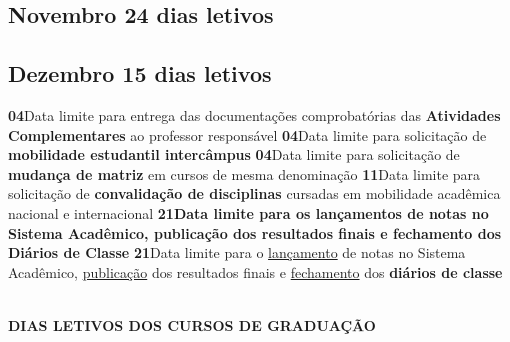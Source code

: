\documentclass[thesis]{hmcposter}
\begin{document}
\begin{poster}
\subsection{Novembro \hfill 24 dias letivos}\subsection{Dezembro \hfill 15 dias letivos}\textbf{04}\qquad Data limite para entrega das documentações comprobatórias das \textbf{Atividades Complementares} ao professor responsável \newline \null\textbf{04}\qquad Data limite para solicitação de \textbf{mobilidade estudantil intercâmpus} \newline \null\textbf{04}\qquad Data limite para solicitação de \textbf{mudança de matriz} em cursos de mesma denominação \newline \null\textbf{11}\qquad Data limite para solicitação de \textbf{convalidação de disciplinas} cursadas em mobilidade acadêmica nacional e internacional \newline \null\textbf{21}\qquad \textbf{Data limite para os lançamentos de notas no Sistema Acadêmico, publicação dos resultados finais e fechamento dos Diários de Classe} \newline \null\textbf{21}\qquad Data limite para o \underline{lançamento} de notas no Sistema Acadêmico, \underline{publicação} dos resultados finais e \underline{fechamento} dos \textbf{diários de classe} \newline \null\newpage
~
\vfill
\begin{center}
\large \textbf{DIAS LETIVOS DOS CURSOS DE GRADUAÇÃO}
\newline
\null
\newline
\begin{table}
\centering
{}
\end{table}
\null
\end{center}

\end{poster}
\end{document}
